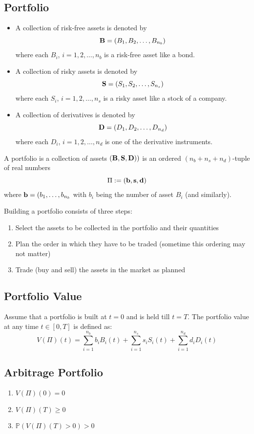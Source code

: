 \documentclass{report}
\begin{document}
\subsection{Portfolio}
\begin{itemize}
    \item A collection of risk-free assets is denoted by
    \[{\bf B} = (B_1, B_2, \dots, B_{n_b})\]
    where each $B_i$, $i = 1, 2, \dots, n_b$ is a risk-free asset like a bond.
    \item A collection of risky assets is denoted by
    \[{\bf S} = (S_1, S_2, \dots, S_{n_s})\]
    where each $S_i$, $i = 1, 2, \dots, n_s$ is a risky asset like a stock of a company.
    \item A collection of derivatives is denoted by
    \[{\bf D} = (D_1, D_2, \dots, D_{n_d})\]
    where each $D_i$, $i = 1, 2, \dots, n_d$ is one of the derivative instruments.
\end{itemize}


A portfolio is a collection of assets $({\bf B, S, D}))$ is an ordered $(n_b + n_s + n_d)$-tuple of real numbers
\[\Pi := ({\bf b, s, d})\]
where ${\bf b} = (b_1, \dots, b_{n_b}$ with $b_i$ being the number of asset $B_i$ (and similarly).


Building a portfolio consists of three steps:
\begin{enumerate}
    \item Select the assets to be collected in the portfolio and their quantities
    \item Plan the order in which they have to be traded (sometime this ordering may not matter)
    \item Trade (buy and sell) the assets in the market as planned
\end{enumerate}

\subsection{Portfolio Value}
Assume that a portfolio is built at $t = 0$ and is held till $t = T$. The portfolio value at any time $t \in [0,T]$ is defined as:
\begin{equation}
    V(\Pi)(t) = \sum_{i=1}^{n_b}b_iB_i(t) + \sum_{i=1}^{n_s}s_iS_i(t) + \sum_{i=1}^{n_d}d_iD_i(t)
\end{equation}

\subsection{Arbitrage Portfolio}
\begin{enumerate}
    \item $V(\Pi)(0) = 0$
    \item $V(\Pi)(T) \geq 0$
    \item \( \mathbb{P}(V(\Pi)(T) > 0) > 0 \)
\end{enumerate}
\end{document}
